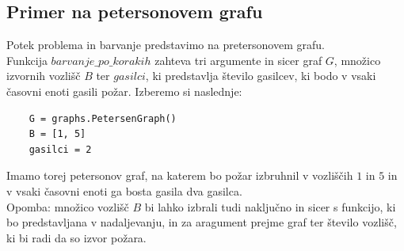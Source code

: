\documentclass[a4paper, 12pt]{article}
\begin{document}
\subsection{Primer na petersonovem grafu}
\noindent Potek problema in barvanje predstavimo na pretersonovem grafu. \\ 
Funkcija $barvanje\_po\_korakih$ zahteva tri argumente
in sicer graf $G$, množico izvornih vozlišč $B$ ter $gasilci$, ki predstavlja število gasilcev, ki 
bodo v vsaki časovni enoti gasili požar.
Izberemo si naslednje:
\begin{verbatim}
    G = graphs.PetersenGraph()
    B = [1, 5]
    gasilci = 2
\end{verbatim}
Imamo torej petersonov graf, na katerem bo požar izbruhnil v vozliščih $1$ in $5$ in v vsaki časovni enoti ga bosta
gasila dva gasilca. \\
Opomba: množico vozlišč $B$ bi lahko izbrali tudi naključno in sicer s funkcijo, ki bo predstavljana
v nadaljevanju, in za aragument prejme graf ter število vozlišč, ki bi radi da so izvor požara. \\
\end{document}

